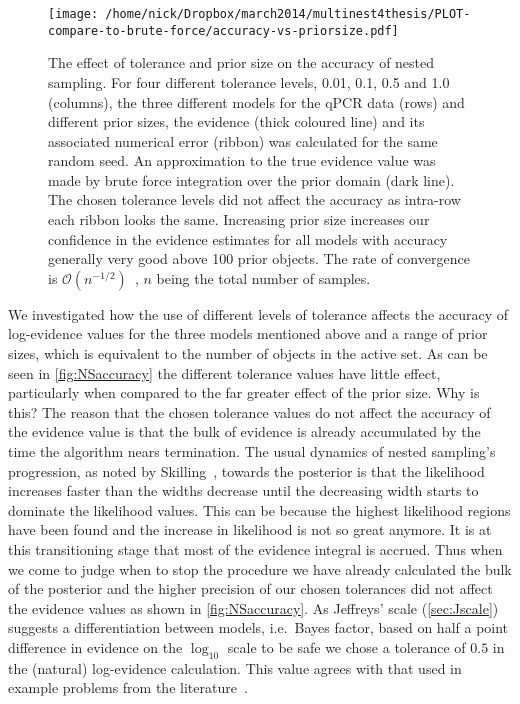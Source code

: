 \begin{figure*}[htbp]
\texttt{[image: /home/nick/Dropbox/march2014/multinest4thesis/PLOT-compare-to-brute-force/accuracy-vs-priorsize.pdf]}
\caption{The effect of tolerance and prior size on the accuracy of nested sampling.
For four different tolerance levels, 0.01, 0.1, 0.5 and 1.0 (columns), the three different models for the qPCR data (rows) and different prior sizes, the evidence (thick coloured line) and its associated numerical error (ribbon) was calculated for the same random seed.
An approximation to the true evidence value was made by brute force integration over the prior domain (dark line).
The chosen tolerance levels did not affect the accuracy as intra-row each ribbon looks the same.
Increasing prior size increases our confidence in the evidence estimates for all models with accuracy generally very good above 100 prior objects.
The rate of convergence is $\mathcal{O}(n^{-1/2})$~\cite{skilling2009convergence,sivia2006}, $n$ being the total number of samples.
}
\label{fig:NSaccuracy}
\end{figure*}
We investigated how the use of different levels of tolerance affects the accuracy of log-evidence values for the three models mentioned above and a range of prior sizes, which is equivalent to the number of objects in the active set.
As can be seen in \autoref{fig:NSaccuracy} the different tolerance values have little effect, particularly when compared to the far greater effect of the prior size.
Why is this?
The reason that the chosen tolerance values do not affect the accuracy of the evidence value is that the bulk of evidence is already accumulated by the time the algorithm nears termination.
The usual dynamics of nested sampling's progression, as noted by Skilling~\cite{Skilling2006}, towards the posterior is that the likelihood increases faster than the widths decrease until the decreasing width starts to dominate the likelihood values.
This can be because the highest likelihood regions have been found and the increase in likelihood is not so great anymore.
It is at this transitioning stage that most of the evidence integral is accrued.
Thus when we come to judge when to stop the procedure we have already calculated the bulk of the posterior and the higher precision of our chosen tolerances did not affect the evidence values as shown in \autoref{fig:NSaccuracy}.
As Jeffreys' scale (\autoref{sec:Jscale}) suggests a differentiation between models, i.e.\ Bayes factor, based on half a point difference in evidence on the $\log_{10}$ scale to be safe we chose a tolerance of $0.5$ in the (natural) log-evidence calculation.
This value agrees with that used in example problems from the literature~\cite{feroz2009multinest}.

